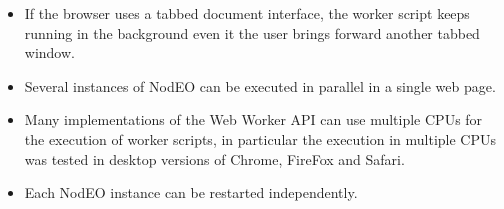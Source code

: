 \documentclass[journal,onecolumn]{IEEEtran}
\begin{document}
\begin{itemize}
\item If the browser uses a tabbed document interface, the worker script
keeps running in the background even it the user brings forward another tabbed
window.
\item Several instances of NodEO can be executed in parallel in a single web
page. %
\item Many implementations of the Web Worker API can use multiple CPUs for
the execution of worker scripts, in particular the execution in multiple CPUs
was tested in desktop versions of Chrome, FireFox and Safari.
\item Each NodEO instance can be restarted independently.
\end{itemize}
\end{document}
